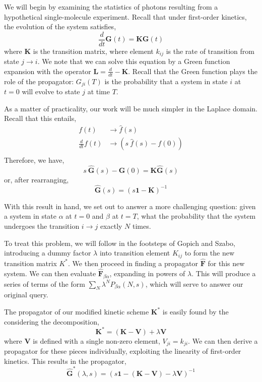 \documentclass{article}
\begin{document}
We will begin by examining the statistics of photons resulting from a
hypothetical single-molecule experiment. Recall that under first-order
kinetics, the evolution of the system satisfies,
\[ \frac{d}{dt} \mathbf{G}(t) = \mathbf{K} \mathbf{G}(t) \]
where $\mathbf{K}$ is the transition matrix, where element $k_{ij}$ is
the rate of transition from state $j \rightarrow i$. We note that we
can solve this equation by a Green function expansion with the
operator $\mathbf{L} = \frac{d}{dt} - \mathbf{K}$. Recall that the
Green function plays the role of the propagator: $G_{ji}(T)$ is the
probability that a system in state $i$ at $t=0$ will evolve to state
$j$ at time $T$.

As a matter of practicality, our work will be much simpler in the
Laplace domain. Recall that this entails,
\begin{align*}
f(t) & \rightarrow \hat f(s) \\
\frac{d}{dt} f(t) & \rightarrow (s~ \hat f(s) - f(0)) \\
\end{align*}
Therefore, we have,
\[ s~\mathbf{\hat G}(s) - \mathbf{G}(0) = \mathbf{K} \mathbf{\hat G}(s) \]
or, after rearranging,
\[ \mathbf{\hat G}(s) = (s \mathbf{1} - \mathbf{K})^{-1} \]

With this result in hand, we set out to answer a more challenging
question: given a system in state $\alpha$ at $t=0$ and $\beta$ at
$t=T$, what the probability that the system undergoes the transition
$i \rightarrow j$ exactly $N$ times.

To treat this problem, we will follow in the footsteps of Gopich and
Szabo\cite{Gopich2003}, introducing a dummy factor $\lambda$ into
transition element $K_{ij}$ to form the new transition matrix $K^*$.
We then proceed in finding a propagator $\mathbf{\hat F}$ for this new
system. We can then evaluate $\mathbf{\hat F}_{\beta\alpha}$,
expanding in powers of $\lambda$. This will produce a series of terms
of the form $\sum_N \lambda^N P_{\beta\alpha}(N, s)$, which will serve
to answer our original query.

The propagator of our modified kinetic scheme $\mathbf{K}^*$ is easily
found by the considering the decomposition,
\[ \mathbf{K}^* = (\mathbf{K} - \mathbf{V}) + \lambda \mathbf{V} \]
where $\mathbf V$ is defined with a single non-zero element, $V_{ji} =
k_{ji}$. 
We can then derive a propagator for these pieces
individually, exploiting the linearity of first-order kinetics.
This results in the propagator,
\[ \mathbf{\hat G}^*(\lambda, s) = \left(s \mathbf{1} - (\mathbf{K} - \mathbf{V}) - \lambda \mathbf{V} \right)^{-1} \]
\end{document}
